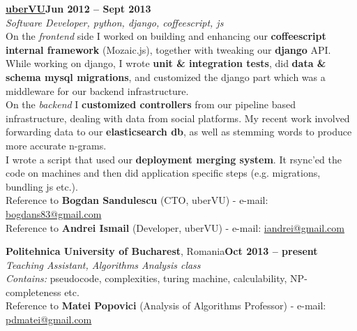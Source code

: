 \documentclass[margin,line]{resume}
\begin{document}
\begin{resume}
	\vspace{1.2mm}\href{http://www.ubervu.com}{\textbf{uberVU}}\hfill \textbf{Jun 2012 -- Sept 2013}\vspace{1.2mm}\\
	\vspace{1mm} \textsl{Software Developer, python, django, coffeescript, js}\vspace{1.5mm}\\
	On the \textit{frontend} side I worked on building and enhancing our \textbf{coffeescript internal framework} (Mozaic.js), together with tweaking our \textbf{django} API. While working on django, I wrote \textbf{unit \& integration tests}, did \textbf{data \& schema mysql migrations}, and customized the django part which was a middleware for our backend infrastructure.\\
	On the \textit{backend} I \textbf{customized controllers} from our pipeline based infrastructure, dealing with data from social platforms. My recent work involved forwarding data to our \textbf{elasticsearch db}, as well as stemming words to produce more accurate n-grams.\\
	I wrote a script that used our \textbf{deployment merging system}. It rsync'ed the code on machines and then did application specific steps (e.g. migrations, bundling js etc.).\vspace{1.5mm}\\
	\small{Reference to \textbf{Bogdan Sandulescu} (CTO, uberVU) - e-mail: \href{mailto:bogdans83@gmail.com}{bogdans83@gmail.com}}\\
	\small{Reference to \textbf{Andrei Ismail} (Developer, uberVU) - e-mail: \href{mailto:iandrei@gmail.com}{iandrei@gmail.com}}

	\vspace{1.2mm}\textbf{Politehnica University of Bucharest}, Romania\hfill \textbf{Oct 2013 -- present}\vspace{1.2mm}\\
	\vspace{1mm} \textsl{Teaching Assistant, Algorithms Analysis class}\vspace{1.5mm}\\
	\textit{Contains:} pseudocode, complexities, turing machine, calculability, NP-completeness etc.\vspace{1.5mm}\\
	\small{Reference to \textbf{Matei Popovici} (Analysis of Algorithms Professor) - e-mail: \href{mailto:pdmatei@gmail.com}{pdmatei@gmail.com}}


\end{resume}
\end{document}
